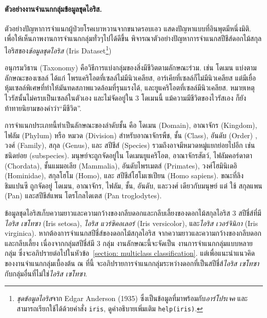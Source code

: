 \paragraph{ตัวอย่างงานจำแนกกลุ่มข้อมูลชุดไอริส.}
ตัวอย่างปัญหาการจำแนกผู้ป่วยโรคเบาหวานจากขนาดรอบเอว แสดงปัญหาแบบที่อินพุตมีหนึ่งมิติ.
เพื่อให้เห็นภาพงานการจำแนกกลุ่มทั่วๆไปได้ดีขึ้น พิจารณาตัวอย่างปัญหาการจำแนกสปีชีส์ดอกไม้สกุลไอริสของ\textit{ข้อมูลชุดไอริส} (Iris Dataset\footnote{\textit{ชุดข้อมูลไอริส}จาก Edgar Anderson (1935) ซึ่งเป็นข้อมูลที่มาพร้อมกับ\textit{อาร์โปรเจค}
และสามารถเรียกใช้ได้ด้วยคำสั่ง \texttt{iris}, ดูคำอธิบายเพิ่มเติม \texttt{help(iris)}.})

{\small
\begin{shaded}
อนุกรมวิธาน (Taxonomy) คือวิธีการแบ่งกลุ่มของสิ่งมีชีวิตตามลักษณะร่วม.
เช่น โดเมน แบ่งตามลักษณะของเซลล์ ได้แก่ โพรแคริโอตที่เซลล์ไม่มีนิวเคลียส, 
อาร์เคียที่เซลล์ก็ไม่มีนิวเคลียส แต่มีเยื่อหุ้มเซลล์พิเศษที่ทำให้มันทดสภาพแวดล้อมที่รุนแรงได้,
และยูแคริโอตที่เซลล์มีนิวเคลียส.
หมายเหตุ ไวรัสนั้นไม่ครบเป็นเซลล์ในตัวเอง และไม่จัดอยู่ใน $3$ โดเมนนี้ 
แม้ความมีชีวิตของไวรัสเอง ก็ยังท้าทายนิยามของคำว่า``มีชีวิต''.

การจำแนกประเภทนี้ทำเป็นลักษณะของลำดับชั้น คือ โดเมน (Domain), อาณาจักร (Kingdom),
 ไฟลัม (Phylum) หรือ หมวด (Division) สำหรับอาณาจักรพืช, ชั้น (Class), อันดับ (Order) , วงศ์ (Family), สกุล (Genus), และ สปีชีส์ (Species) รวมถึงอาจมีหมวดหมู่แยกย่อยไปอีก เช่น ชนิดย่อย (subspecies).
มนุษย์จะถูกจัดอยู่ใน โดเมนยูแคริโอต, อาณาจักรสัตว์, ไฟลัมคอร์ดาตา (Chordata), ชั้นแมมอเลีย (Mammalia), อันดับไพรเมตส์ (Primates), วงศ์โฮมินิเดอิ (Hominidae), สกุลโฮโม (Homo), และ สปีชีส์โฮโมเซเปียน (Homo sapiens).
ขณะที่ลิงชิมแปนซี %
ถูกจัดอยู่ โดเมน, อาณาจักร, ไฟลัม, ชั้น, อันดับ, และวงศ์ เดียวกับมนุษย์ แต่ ใช้ สกุลแพน (Pan) และสปีชีส์แพน โตรโกลไดเตส (Pan troglodytes).
\end{shaded}
}%

ข้อมูลชุดไอริสเก็บความยาวและความกว้างของกลีบดอกและกลีบเลี้ยงของดอกไม้สกุลไอริส $3$ สปีชี่ส์ที่มี 
\textit{ไอริส เซโทซา} (Iris setosa), 
\textit{ไอริส แวร์ซิคอเลอร์} (Iris versicolor), 
และ\textit{ไอริส เวอร์จินิกา} (Iris virginica).
หากต้องการจำแนกสปีชี่ส์ของดอกไม้สกุลไอริส จากความยาวและความกว้างของกลีบดอกและกลีบเลี้ยง
เนื่องจากกลุ่มสปีชี่ส์มี $3$ กลุ่ม
งานลักษณะนี้จะจัดเป็น งานการจำแนกกลุ่มแบบหลายกลุ่ม
ซึ่งจะอภิปรายต่อไปในหัวข้อ~\ref{section: multiclass classification}.
แต่เพื่อแนะนำแนวคิดของงานจำแนกกลุ่มเบื้องต้น ณ ที่นี้ จะอภิปรายการจำแนกกลุ่มระหว่างดอกที่เป็นสปีชี่ส์\textit{ไอริส เซโทซา}กับกลุ่มอื่นที่ไม่ใช่\textit{ไอริส เซโทซา}.

